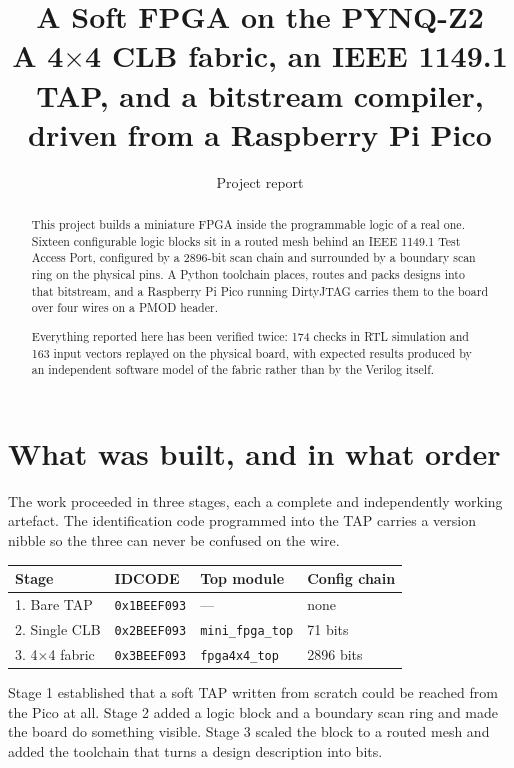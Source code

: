 \documentclass[11pt,a4paper]{article}
\title{\textbf{A Soft FPGA on the PYNQ-Z2}\\[2mm]
       \large A 4$\times$4 CLB fabric, an IEEE 1149.1 TAP, and a bitstream
       compiler, driven from a Raspberry Pi Pico}
\author{Project report}
\date{}
\newcommand{\file}[1]{\texttt{#1}}
\begin{document}
\maketitle

\begin{abstract}
\noindent
This project builds a miniature FPGA inside the programmable logic of a real
one. Sixteen configurable logic blocks sit in a routed mesh behind an
IEEE 1149.1 Test Access Port, configured by a 2896-bit scan chain and surrounded
by a boundary scan ring on the physical pins. A Python toolchain places, routes
and packs designs into that bitstream, and a Raspberry Pi Pico running DirtyJTAG
carries them to the board over four wires on a PMOD header.

Everything reported here has been verified twice: 174 checks in RTL simulation
and 163 input vectors replayed on the physical board, with expected results
produced by an independent software model of the fabric rather than by the
Verilog itself.
\end{abstract}

\tableofcontents
\newpage

\section{What was built, and in what order}

The work proceeded in three stages, each a complete and independently working
artefact. The identification code programmed into the TAP carries a version
nibble so the three can never be confused on the wire.

\begin{center}
\begin{tabular}{llll}
\toprule
\textbf{Stage} & \textbf{IDCODE} & \textbf{Top module} & \textbf{Config chain} \\
\midrule
1. Bare TAP           & \texttt{0x1BEEF093} & ---                    & none \\
2. Single CLB         & \texttt{0x2BEEF093} & \file{mini\_fpga\_top} & 71 bits \\
3. 4$\times$4 fabric  & \texttt{0x3BEEF093} & \file{fpga4x4\_top}    & 2896 bits \\
\bottomrule
\end{tabular}
\end{center}

Stage 1 established that a soft TAP written from scratch could be reached from
the Pico at all. Stage 2 added a logic block and a boundary scan ring and made
the board do something visible. Stage 3 scaled the block to a routed mesh and
added the toolchain that turns a design description into bits.
\end{document}
